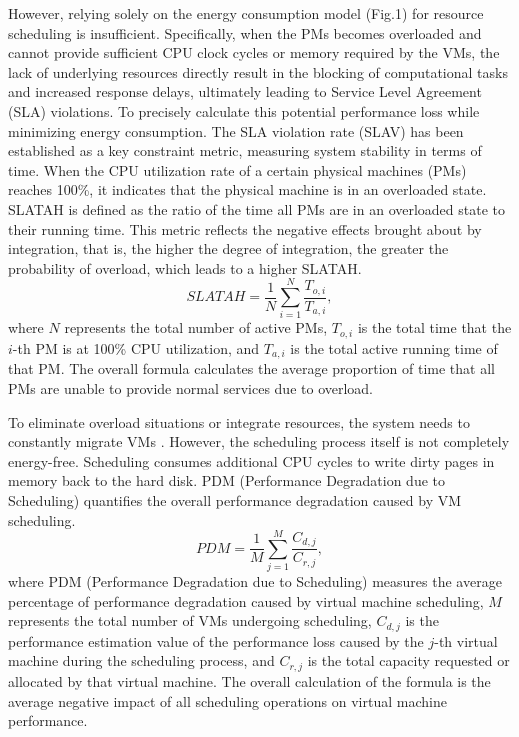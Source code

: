 \documentclass[conference]{{IEEEtran}}
\begin{document}
However, relying solely on the energy consumption model (Fig.1) for resource scheduling is insufficient. Specifically, when the PMs becomes overloaded and cannot provide sufficient CPU clock cycles or memory required by the VMs, the lack of underlying resources directly result in the blocking of computational tasks and increased response delays, ultimately leading to Service Level Agreement (SLA) violations. To precisely calculate this potential performance loss while minimizing energy consumption. The SLA violation rate (SLAV) has been established as a key constraint metric, measuring system stability in terms of time. When the CPU utilization rate of a certain physical machines (PMs) reaches 100\%, it indicates that the physical machine is in an overloaded state. SLATAH is defined as the ratio of the time all PMs are in an overloaded state to their running time. This metric reflects the negative effects brought about by integration, that is, the higher the degree of integration, the greater the probability of overload, which leads to a higher SLATAH.\begin{equation}
    SLATAH = \frac{1}{N} \sum_{i=1}^{N} \frac{T_{o,i}}{T_{a,i}},
    \label{eq:slatah}
   \end{equation}
where $N$ represents the total number of active PMs, $T_{o,i}$ is the total time that the $i$-th PM is at 100\% CPU utilization, and $T_{a,i}$ is the total active running time of that PM. The overall formula calculates the average proportion of time that all PMs are unable to provide normal services due to overload.

To eliminate overload situations or integrate resources, the system needs to constantly migrate VMs \cite{fernando2023v}. However, the scheduling process itself is not completely energy-free. Scheduling consumes additional CPU cycles to write dirty pages in memory back to the hard disk. PDM (Performance Degradation due
to Scheduling) \cite{xia2015stochastic} quantifies the overall performance degradation caused by VM scheduling.
\begin{equation}
    PDM = \frac{1}{M} \sum_{j=1}^{M} \frac{C_{d,j}}{C_{r,j}},
    \label{eq:pdm}
    \end{equation}
where PDM (Performance Degradation due to Scheduling) measures the average percentage of performance degradation caused by virtual machine scheduling, $M$ represents the total number of VMs undergoing scheduling, $C_{d,j}$ is the performance estimation value of the performance loss caused by the $j$-th virtual machine during the scheduling process, and $C_{r,j}$ is the total capacity requested or allocated by that virtual machine. The overall calculation of the formula is the average negative impact of all scheduling operations on virtual machine performance.
\end{document}
